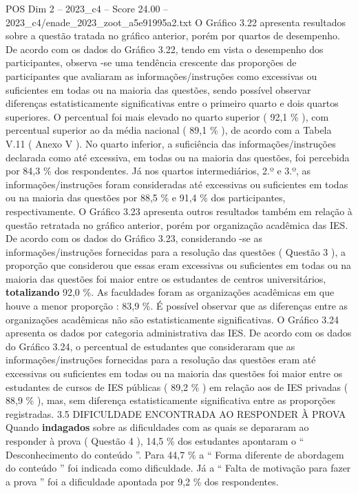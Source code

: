 \begin{textsample}{POS Dim 2 – 2023\_c4 – Score 24.00 – 2023\_c4/enade\_2023\_zoot\_a5e91995a2.txt}
O Gráfico 3.22 apresenta resultados sobre a questão tratada no gráfico anterior, porém por quartos de desempenho.
De acordo com os dados do Gráfico 3.22, tendo em vista o desempenho dos participantes, observa -se uma tendência crescente das proporções de participantes que avaliaram as informações/instruções como excessivas ou suficientes em todas ou na maioria das questões, sendo possível observar diferenças estatisticamente significativas entre o primeiro quarto e dois quartos superiores.
O percentual foi mais elevado no quarto superior ( 92,1 \% ), com percentual superior ao da média nacional ( 89,1 \% ), de acordo com a Tabela V.11 ( Anexo V ).
No quarto inferior, a suficiência das informações/instruções declarada como até excessiva, em todas ou na maioria das questões, foi percebida por 84,3 \% dos respondentes.
Já nos quartos intermediários, 2.º e 3.º, as informações/instruções foram consideradas até excessivas ou suficientes em todas ou na maioria das questões por 88,5 \% e 91,4 \% dos participantes, respectivamente.
O Gráfico 3.23 apresenta outros resultados também em relação à questão retratada no gráfico anterior, porém por organização acadêmica das IES.
De acordo com os dados do Gráfico 3.23, considerando -se as informações/instruções fornecidas para a resolução das questões ( Questão 3 ), a proporção que considerou que essas eram excessivas ou suficientes em todas ou na maioria das questões foi maior entre os estudantes de centros universitários, \textbf{totalizando} 92,0 \%.
As faculdades foram as organizações acadêmicas em que houve a menor proporção : 83,9 \%.
É possível observar que as diferenças entre as organizações acadêmicas não são estatisticamente significativas.
O Gráfico 3.24 apresenta os dados por categoria administrativa das IES.
De acordo com os dados do Gráfico 3.24, o percentual de estudantes que consideraram que as informações/instruções fornecidas para a resolução das questões eram até excessivas ou suficientes em todas ou na maioria das questões foi maior entre os estudantes de cursos de IES públicas ( 89,2 \% ) em relação aos de IES privadas ( 88,9 \% ), mas, sem diferença estatisticamente significativa entre as proporções registradas. 3.5 DIFICULDADE ENCONTRADA AO RESPONDER À PROVA Quando \textbf{indagados} sobre as dificuldades com as quais se depararam ao responder à prova ( Questão 4 ), 14,5 \% dos estudantes apontaram o “ Desconhecimento do conteúdo ”.
Para 44,7 \% a “ Forma diferente de abordagem do conteúdo ” foi indicada como dificuldade.
Já a “ Falta de motivação para fazer a prova ” foi a dificuldade apontada por 9,2 \% dos respondentes.

\end{textsample}
